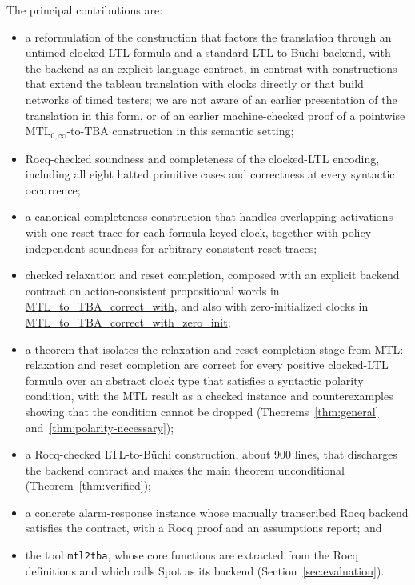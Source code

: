 \documentclass[manuscript]{acmart}
\newcommand{\Rocqid}[1]{\url{#1}}
\begin{document}
The principal contributions are:
\begin{itemize}
  \item a reformulation of the construction that factors the translation
        through an untimed clocked-LTL formula and a standard
        LTL-to-B\"uchi backend, with the backend as an explicit language
        contract, in contrast with constructions that extend the tableau
        translation with clocks directly or that build networks of timed
        testers; we are not aware of an earlier presentation of
        the translation in this form, or of an earlier machine-checked proof of
        a pointwise MTL$_{0,\infty}$-to-TBA construction in this semantic
        setting;
  \item Rocq-checked soundness and completeness of the clocked-LTL encoding,
        including all eight hatted primitive cases and
        correctness at every syntactic occurrence;
  \item a canonical completeness construction that handles overlapping
        activations with one reset trace for each formula-keyed clock,
        together with policy-independent soundness for arbitrary consistent
        reset traces;
  \item checked relaxation and reset completion, composed with an explicit
        backend contract on action-consistent propositional words in
        \Rocqid{MTL_to_TBA_correct_with}, and also with zero-initialized
        clocks in \Rocqid{MTL_to_TBA_correct_with_zero_init};
  \item a theorem that isolates the relaxation and reset-completion stage
        from MTL: relaxation and reset completion are correct for every positive
        clocked-LTL formula over an abstract clock type that satisfies a
        syntactic polarity condition,
        with the MTL result as a checked instance and counterexamples showing
        that the condition cannot be dropped
        (Theorems~\ref{thm:general} and~\ref{thm:polarity-necessary});
  \item a Rocq-checked LTL-to-B\"uchi construction, about 900 lines,
        that discharges the backend contract and makes the main theorem
        unconditional (Theorem~\ref{thm:verified});
  \item a concrete alarm-response instance whose manually transcribed Rocq
        backend satisfies the contract, with a Rocq proof and an
        assumptions report; and
  \item the tool \texttt{mtl2tba}, whose core functions are extracted from the
        Rocq definitions and which calls Spot as its backend
        (Section~\ref{sec:evaluation}).
\end{itemize}
\end{document}

